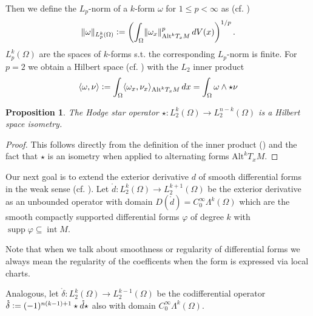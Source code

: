 \documentclass[12pt,a4paper]{article}
\numberwithin{equation}{subsection}
\numberwithin{lemma}{subsection}
\newtheorem{proposition}[lemma]{Proposition}
\theoremstyle{definition}
\DeclareMathOperator{\interior}{int}
\DeclareMathOperator{\supp}{supp}
\newcommand{\smoothcompforms}[2]{C_0^\infty \Lambda^{#1}(#2)}
\begin{document}
Then
we define the $L_p$-norm of a $k$-form $\omega$ for $1\leq p < \infty$
as (cf. \cite{goldshtein})
\begin{align*}
\lVert \omega \rVert _{L_p^k(\Omega)}\vcentcolon=
\left(\int_\Omega \lVert \omega_x \rVert _{\text{Alt}^k T_x M}^p 
    \,dV(x) \right)^{1/p}.
\end{align*}
$L_p^k(\Omega)$ are the spaces of $k$-forms 
s.t. the corresponding $L_p$-norm is finite.
For $p=2$ we obtain a Hilbert space (cf. \cite[Sec. 6.2.6]{arnold}) 
with the $L_2$ inner product  
\begin{align}
    \langle \omega, \nu \rangle \vcentcolon= 
    \int_\Omega \langle \omega_x, \nu_x \rangle _{\text{Alt}^k T_x M} \,dx
    = \int_\Omega \omega \wedge \star \nu
    \label{eq:def_inner_product} 
\end{align}
\begin{proposition}
    The Hodge star operator $\star:L^k_2(\Omega) \rightarrow L^{n-k}_2(\Omega)$ is a
    Hilbert space isometry.
\end{proposition}
\begin{proof}
    This follows directly from the definition of the inner product 
    () and the fact that $\star$ is an isometry 
    when applied to alternating forms $\text{Alt}^k T_x M$.
\end{proof}


Our next goal is to extend the exterior derivative $d$ 
of smooth differential forms in the weak sense (cf. \cite{goldshtein}). 
Let $\mathring{d}: L^k_2(\Omega) \rightarrow L^{k+1}_2(\Omega)$ be the exterior
derivative as an unbounded operator with domain 
$D(\mathring{d}) = \smoothcompforms{k}{\Omega}$ 
which are the smooth compactly supported differential forms $\varphi$ 
of degree $k$
with $\supp \varphi \subseteq \interior M$.

Note that when we talk about smoothness or regularity of differential forms we
always mean the regularity of the coefficents when the form is expressed 
via local charts. 

Analogous, let 
$\mathring{\delta}: L^k_2(\Omega) \rightarrow L^{k-1}_2(\Omega)$ be the 
codifferential operator $\mathring{\delta} \vcentcolon= 
(-1)^{n(k-1)+1}\star\mathring{d}\star$ 
also with domain $\smoothcompforms{k}{\Omega}$. 
\end{document}
